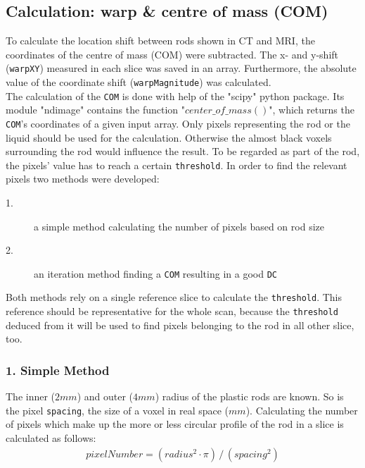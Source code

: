 \subsection{Calculation: warp \& centre of mass (COM)}
\label{sec:COM}

To calculate the location shift between rods shown in CT and MRI, the coordinates of the centre of mass (COM) were subtracted.
The x- and y-shift (\texttt{warpXY}) measured in each slice was saved in an array.
Furthermore, the absolute value of the coordinate shift (\texttt{warpMagnitude}) was calculated.\\

The calculation of the \texttt{COM} is done with help of the "scipy" python package.
Its module "ndimage" contains the function "$center\_of\_mass()$", which returns the \texttt{COM}'s coordinates of a given input array.
Only pixels representing the rod or the liquid should be used for the calculation.
Otherwise the almost black voxels surrounding the rod would influence the result.
To be regarded as part of the rod, the pixels' value has to reach a certain  \texttt{threshold}.
In order to find the relevant pixels two methods were developed:

\begin{description}
 \item[1.] a simple method calculating the number of pixels based on rod size
 \item[2.] an iteration method finding a \texttt{COM} resulting in a good \texttt{DC}
\end{description}

Both methods rely on a single reference slice to calculate the  \texttt{threshold}.
This reference should be representative for the whole scan, because the  \texttt{threshold} deduced from it will be used to find pixels belonging to the rod in all other slice, too.

\subsubsection{1. Simple Method}
The inner ($2mm$) and outer ($4mm$) radius of the plastic rods are known.
So is the pixel \texttt{spacing}, the size of a voxel in real space ($mm$).
Calculating the number of pixels which make up the more or less circular profile of the rod in a slice is calculated as follows:
\begin{align}
 pixelNumber = (radius^2 \cdot \pi) \, / \, (spacing^2)
\end{align}

